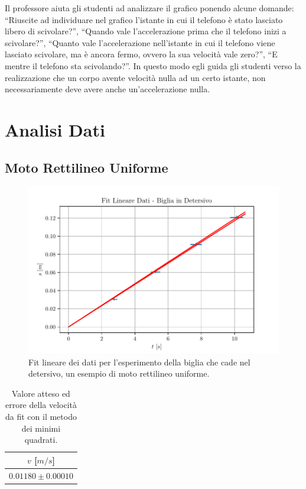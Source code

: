 \documentclass{report} \usepackage[T1]{fontenc} \usepackage[italian]{babel}
\begin{document}
Il professore aiuta gli studenti ad analizzare il grafico ponendo
alcune domande: ``Riuscite ad individuare nel grafico l'istante
in cui il telefono è stato lasciato libero di scivolare?'',
``Quando vale l'accelerazione prima che il telefono inizi a
scivolare?'', ``Quanto vale l'accelerazione nell'istante
in cui il telefono viene lasciato scivolare, ma è ancora fermo,
ovvero la sua velocità vale zero?'', ``E mentre il telefono sta
scivolando?''. In questo modo egli guida gli studenti verso
la realizzazione che un corpo avente velocità nulla ad un certo
istante, non necessariamente deve avere anche un'accelerazione nulla.

\appendix
\chapter{Analisi Dati}
\section{Moto Rettilineo Uniforme}

\begin{figure}[H]
\centering
  \includegraphics[width=\textwidth]{fit_marble}
  \caption{Fit lineare dei dati per l'esperimento della biglia che cade nel detersivo,
           un esempio di moto rettilineo uniforme.}
  \label{fig:fit_marble}
\end{figure}

\begin{table}[H]
  \renewcommand{\arraystretch}{1.5}
  \centering
  \begin{tabular}{ | c | }
    \hline
    $v$ [$m/s$] \\
    \hline
    $0.01180\pm0.00010$ \\
    \hline
  \end{tabular}
  \caption{Valore atteso ed errore della velocità da fit con il metodo dei minimi
           quadrati.}
  \label{tab:fit_marble}
\end{table}
\end{document}
